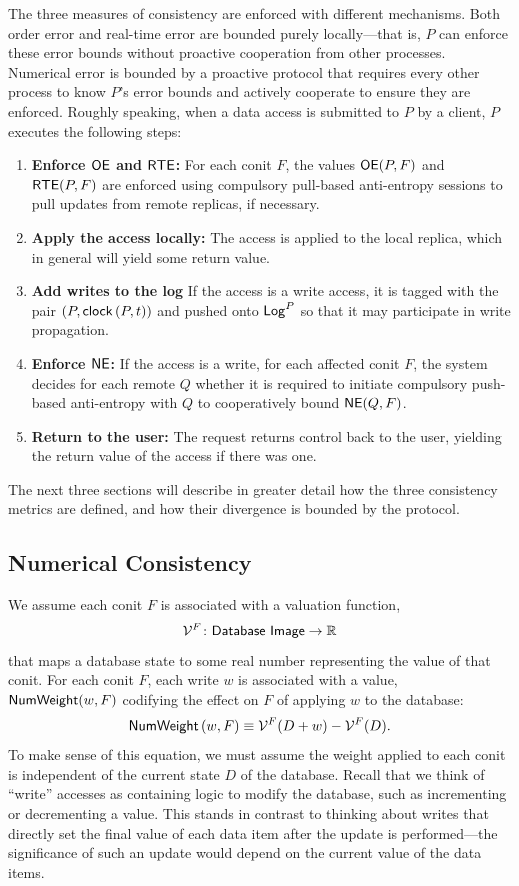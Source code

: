 \documentclass[]             %
{NASA}                       %
\theoremstyle{definition}
\begin{document}
The three measures of consistency are enforced with different
mechanisms. Both order error and real-time error are bounded purely
locally---that is, $P$ can enforce these error bounds without
proactive cooperation from other processes. Numerical error is bounded
by a proactive protocol that requires every other process to know
$P$'s error bounds and actively cooperate to ensure they are enforced.
Roughly speaking, when a data access is submitted to $P$ by a client,
$P$ executes the following steps:
\begin{enumerate}
\item \textbf{Enforce $\mathsf{OE}$ and $\mathsf{RTE}$:} For each conit $F$, the
  values $\mathsf{OE}(P, F)$ and $\mathsf{RTE}(P, F)$ are enforced using compulsory
  pull-based anti-entropy sessions to pull updates from remote
  replicas, if necessary.
\item \textbf{Apply the access locally:} The access is applied to the
  local replica, which in general will yield some return value.
\item \textbf{Add writes to the log} If the access is a write access,
  it is tagged with the pair $(P, \mathsf{clock}\left(P,t\right))$ and pushed onto $\mathsf{Log}^{P}$ so
  that it may participate in write propagation.
\item \textbf{Enforce $\mathsf{NE}$:} If the access is a write, for each
  affected conit $F$, the system decides for each remote $Q$ whether
  it is required to initiate compulsory push-based anti-entropy with
  $Q$ to cooperatively bound $\mathsf{NE}(Q, F)$.
\item \textbf{Return to the user:} The request returns control back to
  the user, yielding the return value of the access if there was one.
\end{enumerate}

The next three sections will describe in greater detail how the three
consistency metrics are defined, and how their divergence is bounded
by the protocol.

\subsection{Numerical Consistency}
\label{ssec:conit-numerical-consistency}
We assume each conit $F$ is associated with a valuation function,
\[
  \mathcal{V}^F\colon \mathsf{Database\ Image} \to \mathbb{R}
\]
that maps a database state to some real number representing the value
of that conit. For each conit $F$, each write $w$ is associated with a
value, $\mathsf{NumWeight}(w, F)$ codifying the effect on $F$ of
applying $w$ to the database:
\begin{equation*}
  \mathsf{NumWeight}\left(w, F\right) \equiv \mathcal{V}^F(D + w) - \mathcal{V}^F(D).
\end{equation*}
To make sense of this equation, we must assume the weight applied to
each conit is independent of the current state $D$ of the
database. Recall that we think of ``write'' accesses as containing
logic to modify the database, such as incrementing or decrementing a
value. This stands in contrast to thinking about writes that directly
set the final value of each data item after the update is
performed---the significance of such an update would depend on the
current value of the data items.
\end{document}
